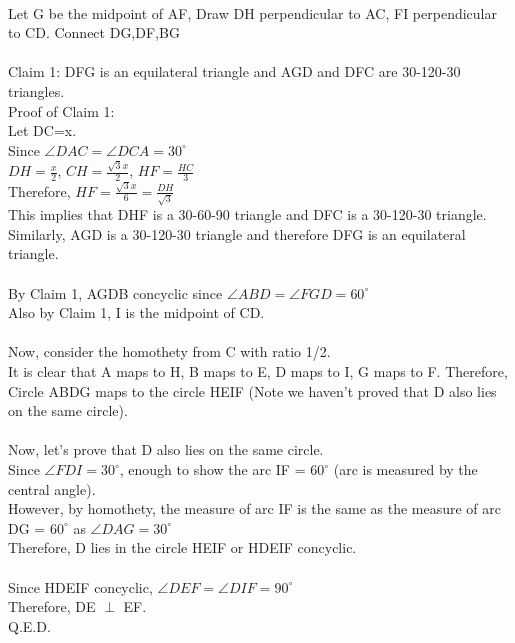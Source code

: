 \documentclass{article}
\begin{document}
\\
Let G be the midpoint of AF, Draw DH perpendicular to AC, FI perpendicular to CD.
Connect DG,DF,BG\\
\\
Claim 1: DFG is an equilateral triangle and AGD and DFC are 30-120-30 triangles.\\
Proof of Claim 1:\\
Let DC=x.\\
Since $\angle DAC = \angle DCA = 30^\circ$\\
$DH=\frac{x}{2}$, $CH = \frac{\sqrt{3}x}{2}$, $HF = \frac{HC}{3}$\\
Therefore, $HF = \frac{\sqrt{3}x}{6} = \frac{DH}{\sqrt{3}}$\\
This implies that DHF is a 30-60-90 triangle and DFC is a 30-120-30 triangle.\\
Similarly, AGD is a 30-120-30 triangle and therefore DFG is an equilateral triangle.\\
\\
By Claim 1, AGDB concyclic since $\angle ABD = \angle FGD = 60^\circ$\\
Also by Claim 1, I is the midpoint of CD.\\
\\
Now, consider the homothety from C with ratio 1/2.\\
It is clear that A maps to H, B maps to E, D maps to I, G maps to F.
Therefore, Circle ABDG maps to the circle HEIF (Note we haven't proved that D also lies on the same circle).\\
\\
Now, let's prove that D also lies on the same circle.\\
Since $\angle FDI = 30^\circ$, enough to show the arc IF = $60^\circ$ (arc is measured by the central angle).\\
However, by homothety, the measure of arc IF is the same as the measure of arc DG = $60^\circ$ as $\angle DAG =30^\circ$\\
Therefore, D lies in the circle HEIF or HDEIF concyclic.\\
\\
Since HDEIF concyclic, $\angle DEF=\angle DIF = 90^\circ$\\
Therefore, DE \(\perp\) EF.\\
Q.E.D.
\end{document}
